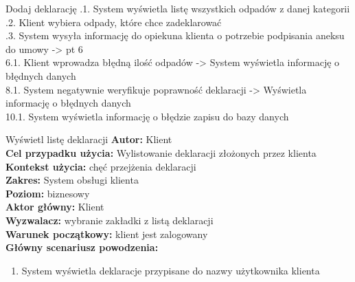 \begin{usecase}{Dodaj deklarację}
			.1. System wyświetla listę wszystkich odpadów z danej kategorii \\
			.2. Klient wybiera odpady, które chce zadeklarować \\
			.3. System wysyła informację do opiekuna klienta o potrzebie podpisania aneksu do umowy -> pt 6 \\
		6.1. Klient wprowadza błędną ilość odpadów -> System wyświetla informację o błędnych danych \\
		8.1. System negatywnie weryfikuje poprawność deklaracji -> Wyświetla informację o błędnych danych \\
		10.1. System wyświetla informację o błędzie zapisu do bazy danych \\
\end{usecase}

\begin{usecase}{Wyświetl listę deklaracji}
	\textbf{Autor:} Klient\\
	\textbf{Cel przypadku użycia:} Wylistowanie deklaracji złożonych przez klienta \\
	\textbf{Kontekst użycia:} chęć przejżenia deklaracji\\
	\textbf{Zakres:} System obsługi klienta \\
	\textbf{Poziom:} biznesowy \\
	\textbf{Aktor główny:} Klient\\
	\textbf{Wyzwalacz:} wybranie zakładki z listą deklaracji \\
	\textbf{Warunek początkowy:} klient jest zalogowany \\
	\textbf{Główny scenariusz powodzenia:} \\
		\begin{enumerate}
			\item System wyświetla deklaracje przypisane do nazwy użytkownika klienta
		\end{enumerate}
\end{usecase}

